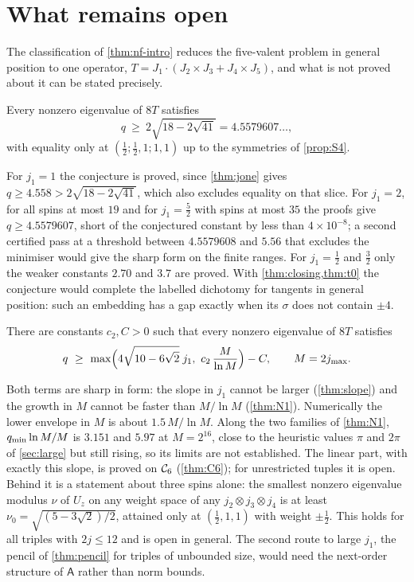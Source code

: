 \section{What remains open}\label{sec:open}

The classification of \cref{thm:nf-intro} reduces the five-valent problem in general position to one
operator, $T=J_1\cdot(J_2\times J_3+J_4\times J_5)$, and what is not proved about it can
be stated precisely.

\begin{conjecture}\label{conj:B}
Every nonzero eigenvalue of $8T$ satisfies
\[
  q\ \ge\ 2\sqrt{18-2\sqrt{41}}=4.5579607\ldots,
\]
with equality only at $(\frac12;\frac12,1;1,1)$ up to the symmetries of \cref{prop:S4}.
\end{conjecture}

For $j_1=1$ the conjecture is proved, since \cref{thm:jone} gives
$q\ge4.558>2\sqrt{18-2\sqrt{41}}$, which also excludes equality on that slice. For
$j_1=2$, for all spins at most $19$ and for $j_1=\frac52$ with spins at most $35$ the
proofs give $q\ge4.5579607$, short of the conjectured constant by less than
$4\times10^{-8}$; a second certified pass at a threshold between $4.5579608$ and $5.56$
that excludes the minimiser would give the sharp form on the finite ranges. For
$j_1=\frac12$ and $\frac32$ only the weaker constants $2.70$ and $3.7$ are proved. With
\cref{thm:closing,thm:t0} the conjecture would complete the labelled dichotomy for
tangents in general position: such an embedding has a gap exactly when its $\sigma$ does
not contain $\pm4$.

\begin{conjecture}\label{conj:L}
There are constants $c_2,C>0$ such that every nonzero eigenvalue of $8T$ satisfies
\[
  q\ \ge\ \max\Bigl(4\sqrt{10-6\sqrt2}\;j_1,\ c_2\,\frac{M}{\ln M}\Bigr)-C,\qquad M=2j_{\max}.
\]
\end{conjecture}

Both terms are sharp in form: the slope in $j_1$ cannot be larger (\cref{thm:slope}) and
the growth in $M$ cannot be faster than $M/\ln M$ (\cref{thm:N1}). Numerically the lower
envelope in $M$ is about $1.5\,M/\ln M$. Along the two families of \cref{thm:N1},
$q_{\min}\ln M/M$ is $3.151$ and $5.97$ at $M=2^{16}$, close to the heuristic values $\pi$ and
$2\pi$ of \cref{sec:large} but still rising, so its limits are not established. The linear part, with exactly this slope, is proved on $\mathcal{C}_6$ (\cref{thm:C6}); for
unrestricted tuples it is open. Behind it is a
statement about three spins alone: the smallest nonzero eigenvalue modulus $\nu$ of
$U_z$ on any weight space of any $j_2\otimes j_3\otimes j_4$ is at least
$\nu_0=\sqrt{(5-3\sqrt2)/2}$, attained only at $(\frac12,1,1)$ with weight $\pm\frac12$.
This holds for all triples with $2j\le12$ and is open in general. The second route to
large $j_1$, the pencil of \cref{thm:pencil} for triples of unbounded size, would need
the next-order structure of $\mathsf A$ rather than norm bounds.

